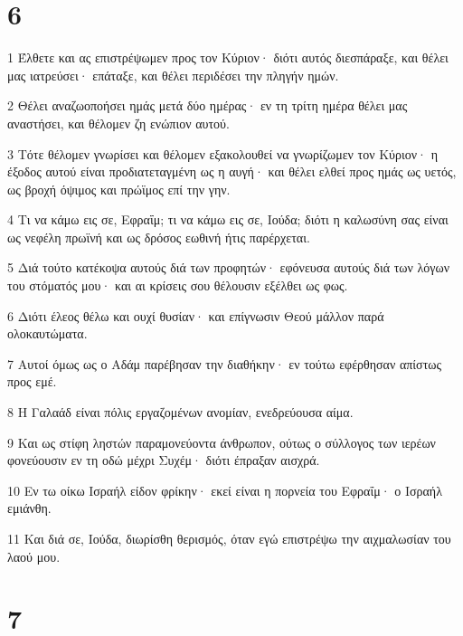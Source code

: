\chapter{6}

\par 1 Έλθετε και ας επιστρέψωμεν προς τον Κύριον· διότι αυτός διεσπάραξε, και θέλει μας ιατρεύσει· επάταξε, και θέλει περιδέσει την πληγήν ημών.
\par 2 Θέλει αναζωοποήσει ημάς μετά δύο ημέρας· εν τη τρίτη ημέρα θέλει μας αναστήσει, και θέλομεν ζη ενώπιον αυτού.
\par 3 Τότε θέλομεν γνωρίσει και θέλομεν εξακολουθεί να γνωρίζωμεν τον Κύριον· η έξοδος αυτού είναι προδιατεταγμένη ως η αυγή· και θέλει ελθεί προς ημάς ως υετός, ως βροχή όψιμος και πρώϊμος επί την γην.
\par 4 Τι να κάμω εις σε, Εφραΐμ; τι να κάμω εις σε, Ιούδα; διότι η καλωσύνη σας είναι ως νεφέλη πρωϊνή και ως δρόσος εωθινή ήτις παρέρχεται.
\par 5 Διά τούτο κατέκοψα αυτούς διά των προφητών· εφόνευσα αυτούς διά των λόγων του στόματός μου· και αι κρίσεις σου θέλουσιν εξέλθει ως φως.
\par 6 Διότι έλεος θέλω και ουχί θυσίαν· και επίγνωσιν Θεού μάλλον παρά ολοκαυτώματα.
\par 7 Αυτοί όμως ως ο Αδάμ παρέβησαν την διαθήκην· εν τούτω εφέρθησαν απίστως προς εμέ.
\par 8 Η Γαλαάδ είναι πόλις εργαζομένων ανομίαν, ενεδρεύουσα αίμα.
\par 9 Και ως στίφη ληστών παραμονεύοντα άνθρωπον, ούτως ο σύλλογος των ιερέων φονεύουσιν εν τη οδώ μέχρι Συχέμ· διότι έπραξαν αισχρά.
\par 10 Εν τω οίκω Ισραήλ είδον φρίκην· εκεί είναι η πορνεία του Εφραΐμ· ο Ισραήλ εμιάνθη.
\par 11 Και διά σε, Ιούδα, διωρίσθη θερισμός, όταν εγώ επιστρέψω την αιχμαλωσίαν του λαού μου.

\chapter{7}


